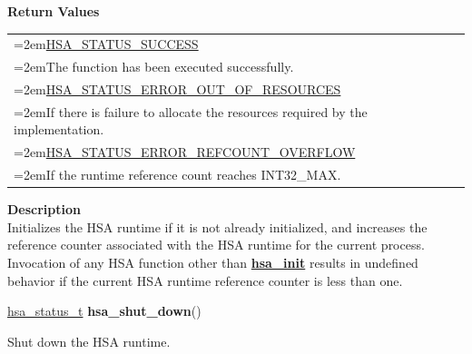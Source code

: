 \documentclass[final]{book}
\newcommand{\reffun}[1]{\textbf{#1}}
\begin{document}
\noindent\textbf{Return Values}\\[-6mm]
\noindent\begin{longtable}{@{}>{\hangindent=2em}p{\linewidth}}
\hyperlink{group__status_1ggad755322e7ff95456520e8abdbe90d225ae382ea0c9c05cce5a60d0317375159cc}{HSA_STATUS_SUCCESS}\\\hspace{2em}The function has been executed successfully.\\[2mm]
\hyperlink{group__status_1ggad755322e7ff95456520e8abdbe90d225a1a77fcf36d0d140874c4361ab093eff7}{HSA_STATUS_ERROR_OUT_OF_RESOURCES}\\\hspace{2em}If there is failure to allocate the resources required by the implementation.\\[2mm]
\hyperlink{group__status_1ggad755322e7ff95456520e8abdbe90d225aa9218eed04d1d2ffc5ed8f33f2cd1c9b}{HSA_STATUS_ERROR_REFCOUNT_OVERFLOW}\\\hspace{2em}If the runtime reference count reaches INT32_MAX.
\end{longtable}
\vspace{-4mm}\noindent\textbf{Description}\\[1mm]
Initializes the HSA runtime if it is not already initialized, and increases the reference counter associated with the HSA runtime for the current process. Invocation of any HSA function other than \hyperlink{group__initshutdown_1ga5b8574433e7dbcbd31ea397a02e3c32b}{\reffun{hsa_init}} results in undefined behavior if the current HSA runtime reference counter is less than one. 


\noindent\begin{tcolorbox}[breakable,nobeforeafter,colframe=white,colback=lightgray,left=0mm]
\hyperlink{group__status_1gad755322e7ff95456520e8abdbe90d225}{hsa_status_t} \hypertarget{group__initshutdown_1ga97bdbccbd372609ad14a7ae7389cf4bf}{\textbf{hsa_shut_down}}()

\end{tcolorbox}
Shut down the HSA runtime.
\end{document}
